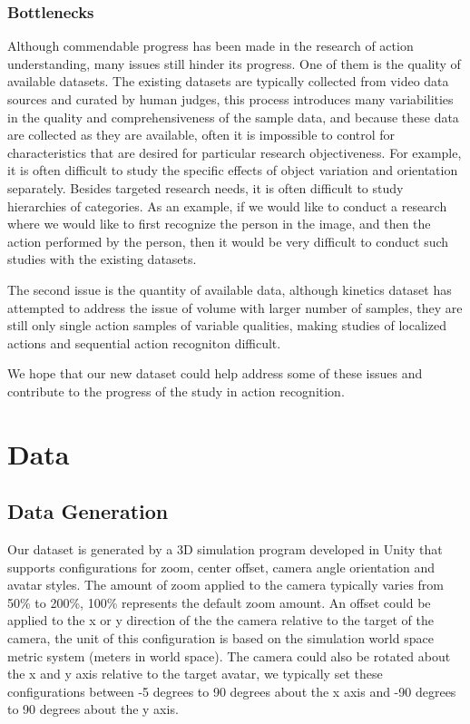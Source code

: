 \documentclass[
	a4paper, %
	10pt, %
	unnumberedsections, %
	twoside, %
]{t0004}
\begin{document}
\subsubsection{Bottlenecks} Although commendable progress has been made in the research of action understanding, many issues still hinder its progress. One of them is the quality of available datasets. The existing datasets are typically collected from video data sources and curated by human judges, this process introduces many variabilities in the quality and comprehensiveness of the sample data, and because these data are collected as they are available, often it is impossible to control for characteristics that are desired for particular research objectiveness. For example, it is often difficult to study the specific effects of object variation and orientation separately. Besides targeted research needs, it is often difficult to study hierarchies of categories. As an example, if we would like to conduct a research where we would like to first recognize the person in the image, and then the action performed by the person, then it would be very difficult to conduct such studies with the existing datasets.

The second issue is the quantity of available data, although kinetics dataset has attempted to address the issue of volume with larger number of samples, they are still only single action samples of variable qualities, making studies of localized actions and sequential action recogniton difficult.

We hope that our new dataset could help address some of these issues and contribute to the progress of the study in action recognition.

\section{Data}

\subsection{Data Generation} Our dataset is generated by a 3D simulation program developed in Unity that supports configurations for zoom, center offset, camera angle orientation and avatar styles. The amount of zoom applied to the camera typically varies from 50\% to 200\%, 100\% represents the default zoom amount. An offset could be applied to the x or y direction of the the camera relative to the target of the camera, the unit of this configuration is based on the simulation world space metric system (meters in world space).  The camera could also be rotated about the x and y axis relative to the target avatar, we typically set these configurations between -5 degrees to 90 degrees about the x axis and -90 degrees to 90 degrees about the y axis.
\end{document}
